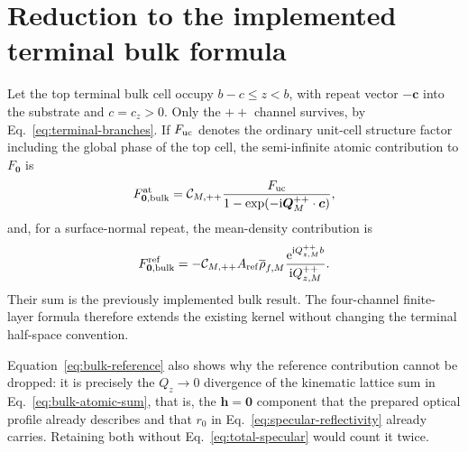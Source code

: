 \section{Reduction to the implemented terminal bulk formula}

Let the top terminal bulk cell occupy $b-c\leq z<b$, with repeat vector
$-\bm c$ into the substrate and $c=c_z>0$.  Only the $++$ channel survives, by
Eq.~\eqref{eq:terminal-branches}.  If $F_{\rm uc}$ denotes the ordinary
unit-cell structure factor including the global phase of the top cell, the
semi-infinite atomic contribution to $F_{\bm 0}$ is
\begin{equation}
  F_{\bm 0,\rm bulk}^{\rm at}
  =\mathcal C_{M,++}
   \frac{F_{\rm uc}}
        {1-\exp(-\mathrm{i}\bm Q_M^{++}\mathbin{\cdot}\bm c)},
  \label{eq:bulk-atomic-sum}
\end{equation}
and, for a surface-normal repeat, the mean-density contribution is
\begin{equation}
  F_{\bm 0,\rm bulk}^{\rm ref}
  =-\mathcal C_{M,++}A_{\rm ref}\overline\rho_{f,M}
   \frac{\mathrm{e}^{\mathrm{i} Q_{z,M}^{++}b}}{\mathrm{i} Q_{z,M}^{++}}.
  \label{eq:bulk-reference}
\end{equation}
Their sum is the previously implemented bulk result.  The four-channel
finite-layer formula therefore extends the existing kernel without changing
the terminal half-space convention.

Equation~\eqref{eq:bulk-reference} also shows why the reference contribution
cannot be dropped: it is precisely the $Q_z\to0$ divergence of the kinematic
lattice sum in Eq.~\eqref{eq:bulk-atomic-sum}, that is, the $\bm h=\bm 0$
component that the prepared optical profile already describes and that $r_0$
in Eq.~\eqref{eq:specular-reflectivity} already carries.  Retaining both
without Eq.~\eqref{eq:total-specular} would count it twice.

